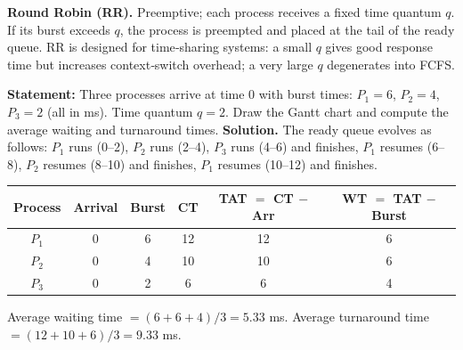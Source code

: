 \documentclass[11pt]{article}
\newcommand{\cle}[1]{{\popxbold\color{popdark}#1}}
\newcommand{\legende}[1]{\par\vspace{6pt}{\popsemi\fontsize{9}{11.5}\selectfont\color{popmuted}#1}}
\begin{document}
\textbf{Round Robin (RR).}  Preemptive; each process receives a fixed \cle{time quantum} $q$.  If its burst exceeds $q$, the process is preempted and placed at the tail of the ready queue.  RR is designed for time‑sharing systems: a small $q$ gives good response time but increases context‑switch overhead; a very large $q$ degenerates into FCFS.

\begin{exoresolu}
\textbf{Statement:} Three processes arrive at time 0 with burst times: $P_1=6$, $P_2=4$, $P_3=2$ (all in ms).  Time quantum $q=2$.  Draw the Gantt chart and compute the average waiting and turnaround times.
\tcblower
\textbf{Solution.}  The ready queue evolves as follows: $P_1$ runs (0–2), $P_2$ runs (2–4), $P_3$ runs (4–6) and finishes, $P_1$ resumes (6–8), $P_2$ resumes (8–10) and finishes, $P_1$ resumes (10–12) and finishes.

\begin{popfigure}
\legende{Gantt chart for Round Robin with $q=2$.}
\end{popfigure}

\begin{center}
\begin{tabular}{|c|c|c|c|c|c|}\hline
\rowcolor{popblueL}
Process & Arrival & Burst & CT & TAT $=$ CT $-$ Arr & WT $=$ TAT $-$ Burst \\ \hline
$P_1$ & 0 & 6 & 12 & 12 & 6 \\ \hline
$P_2$ & 0 & 4 & 10 & 10 & 6 \\ \hline
$P_3$ & 0 & 2 & 6  & 6  & 4 \\ \hline
\end{tabular}
\end{center}
Average waiting time $= (6+6+4)/3 = 5.33$ ms.  Average turnaround time $= (12+10+6)/3 = 9.33$ ms.
\end{exoresolu}
\end{document}
